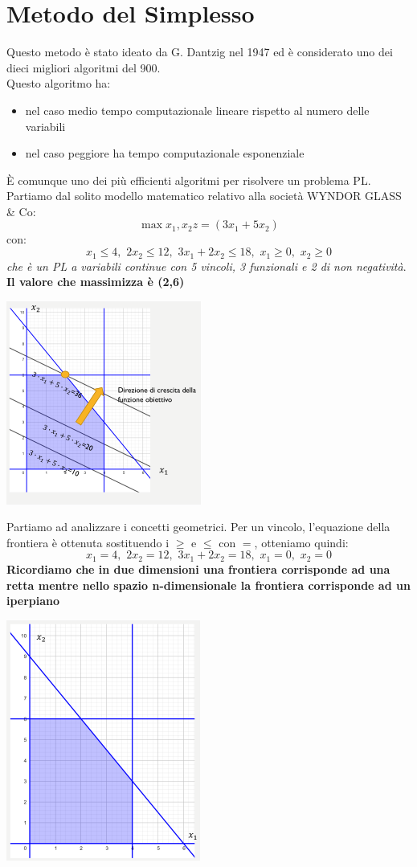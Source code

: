 \message{ !name(ro.tex)}\documentclass[a4paper,12pt, oneside]{book}
\begin{document}
\section{Metodo del Simplesso}
Questo metodo è stato ideato da G. Dantzig nel 1947 ed è considerato
uno dei dieci migliori algoritmi del 900.\\
Questo algoritmo ha:
\begin{itemize}
  \item nel caso medio tempo computazionale lineare rispetto al numero
  delle variabili
  \item nel caso peggiore ha tempo computazionale esponenziale
\end{itemize}
È comunque uno dei più efficienti algoritmi per risolvere un problema
PL.\\
Partiamo dal solito modello matematico relativo alla società
WYNDOR GLASS \& Co:
\[\max{x_1,x_2} z= (3x_1+5x_2)\]
con:
\[x_1\leq 4,\,\,2x_2\leq 12,\,\,3x_1+2x_2\leq 18,\,\,x_1\geq 0,\,\,
  x_2\geq 0\]
\textit{che è un PL a variabili continue con 5 vincoli, 3 funzionali e
  2 di non negatività}. \textbf{Il valore che massimizza è (2,6)}
\begin{center}
  \includegraphics[scale = 0.8]{img/simp.png}
\end{center}
Partiamo ad analizzare i concetti geometrici. Per un vincolo,
l’equazione della frontiera è ottenuta sostituendo i $\geq$ e $\leq$
con $=$, otteniamo quindi:
\[x_1= 4,\,\,2x_2= 12,\,\,3x_1+2x_2= 18,\,\,x_1= 0,\,\,
  x_2= 0\]
\textbf{Ricordiamo che in due dimensioni una frontiera corrisponde ad
  una retta mentre nello spazio n-dimensionale la frontiera corrisponde ad un
  iperpiano}
\begin{center}
  \includegraphics[scale = 0.8]{img/simp2.png}
\end{center}
\end{document}
